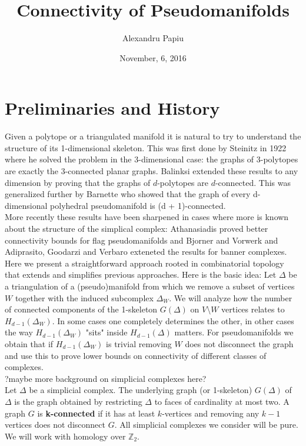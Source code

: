 \documentclass[a4paper]{article}
\title{Connectivity of Pseudomanifolds}
\author{Alexandru Papiu}
\date{November, 6, 2016}
\begin{document}
\maketitle



\section{Preliminaries and History}

\large {
 
Given a polytope or a triangulated manifold it is natural to try to understand  the structure of its 1-dimensional skeleton. This was first done by Steinitz in 1922 where he solved the problem in the 3-dimensional case: the graphs of 3-polytopes are exactly the 3-connected planar graphs. Balinksi extended these results to any dimension by proving that the graphs of $d$-polytopes are $d$-connected.  This was generalized further by Barnette who showed that the graph of every d-dimensional polyhedral pseudomanifold is (d + 1)-connected. \\

More recently these results have been sharpened in cases where more is known about the structure of the simplical complex: Athanasiadis \cite{athana} proved better connectivity bounds for flag pseudomanifolds and Bjorner and Vorwerk \cite{bjorner} and Adiprasito, Goodarzi and Verbaro \cite{adiprasito} exteneted the results for banner complexes.  \\


Here we present a straightforward approach rooted in combinatorial topology that extends and simplifies previous approaches. Here is the basic idea: Let $\Delta$ be a triangulation of a (pseudo)manifold from which we remove a subset of vertices $W$ together with the induced subcomplex $\Delta_W$. We will analyze how the number of connected components of the 1-skeleton $G(\Delta)$ on $V\setminus W$ vertices relates to $H_{d-1}(\Delta_W)$. In some cases one completely determines the other, in other cases the way $H_{d-1}(\Delta_W)$ "sits" inside $H_{d-1}(\Delta)$ matters. For pseudomanifolds we obtain that if $H_{d-1}(\Delta_W)$ is trivial removing $W$ does not disconnect the graph and use this to prove lower bounds on connectivity of different classes of complexes. \\


?maybe more background on simplicial complexes here? \\

Let $\Delta$ be a simplicial complex.  The underlying graph (or
1-skeleton) $G(\Delta)$ of $\Delta$ is the graph obtained by restricting $\Delta$ to faces of cardinality at most two. A graph $G$ is \textbf{k-connected} if it has at least $k$-vertices and removing any $k-1$ vertices does not disconnect $G$. All simplicial complexes we consider will be pure. We will work with homology over $\mathbb{Z}_2 $. \\

}
\end{document}
